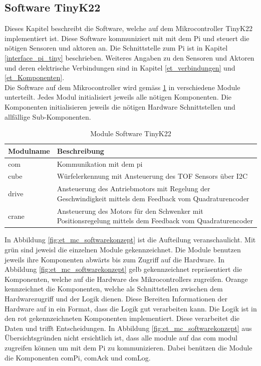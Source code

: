 \documentclass[../../main.tex]{subfiles}
\begin{document}
    \subsection{Software TinyK22} \label{et_software_tiny}
    Dieses Kapitel beschreibt die Software, welche auf dem Mikrocontroller TinyK22 implementiert ist. Diese Software kommuniziert mit mit dem Pi und steuert die nötigen Sensoren und aktoren an. Die Schnittstelle zum Pi ist in Kapitel \ref{interface_pi_tiny} beschrieben. Weiteres Angaben zu den Sensoren und Aktoren und deren elektrische Verbindungen sind in Kapitel \ref{et_verbindungen} und \ref{et_Komponenten}.\\
    Die Software auf dem Mikrocontroller wird gemäss \ref{tab:et_mc_softwarekonzept} in verschiedene Module unterteilt. Jedes Modul initialisiert jeweils alle nötigen Komponenten. Die Komponenten initialisieren jeweils die nötigen Hardware Schnittstellen und allfällige Sub-Komponenten.\\

    \begin{table}[H]
        \centering
        \begin{tabular}{|l|p{12cm}|}
        \hline
        \textbf{Modulname} & \textbf{Beschreibung}    \\ \hline
        com   & Kommunikation mit dem pi                                                                                 \\ \hline
        cube  & Würfelerkennung mit Ansteuerung des TOF Sensors über I2C                                                 \\ \hline
        drive & Ansteuerung des Antriebmotors mit Regelung der Geschwindigkeit mittels dem Feedback vom Quadraturencoder \\ \hline
        crane & Ansteuerung des Motors für den Schwenker mit Positionsregelung mittels dem Feedback vom Quadraturencoder \\ \hline
        \end{tabular}
        \caption{Module Software TinyK22}
        \label{tab:et_mc_softwarekonzept}
    \end{table}


    In Abbildung \ref{fig:et_mc_softwarekonzept} ist die Aufteilung veranschaulicht. Mit grün sind jeweisl die einzelnen Module gekennzeichnet. Die Module benutzen jeweils ihre Komponenten abwärts bis zum Zugriff auf die Hardware. In Abbildung \ref{fig:et_mc_softwarekonzept} gelb gekennzeichnet repräsentiert die Komponenten, welche auf die Hardware des Mikrocontrollers zugreifen. Orange kennzeichnet die Komponenten, welche als Schnittstellen zwischen dem Hardwarezugriff und der Logik dienen. Diese Bereiten Informationen der Hardware auf in ein Format, dass die Logik gut verarbeiten kann. Die Logik ist in den rot gekennzeichneten Komponenten implementiert. Diese verarbeitet die Daten und trifft Entscheidungen.
    In Abbildung \ref{fig:et_mc_softwarekonzept} aus Übersichtsgründen nicht ersichtlich ist, dass alle module auf das com modul zugreifen können um mit dem Pi zu kommunizieren. Dabei benützen die Module die Komponenten comPi, comAck und comLog.\\
\end{document}
